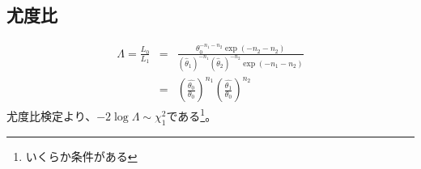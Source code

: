 \subsection{尤度比}
\begin{eqnarray}
    \varLambda = \frac{L_{0}}{L_{1}} &=& \frac{ \theta_0^{-n_1-n_2}\exp(-n_2-n_2) }{ (\hat{\theta}_1)^{-n_1}(\hat{\theta}_2)^{-n_2} \exp(-n_1-n_2)}\\
    &=& \left(\frac{\hat{\theta_0}}{\theta_0}\right)^{n_1} \left(\frac{\hat{\theta_1}}{\theta_0} \right)^{n_2}
\end{eqnarray}
尤度比検定より、$-2\log \varLambda \sim\chi^2_1$である\footnote{いくらか条件がある}。

